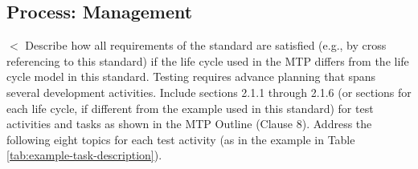 	\subsection{Process: Management} \label{s:details-of-the-master-test-plan:process-management}
			$<$ Describe how all requirements of the standard are satisfied (e.g., by cross referencing to this standard) if the life cycle used in the MTP differs from the life cycle model in this standard. Testing requires advance planning that spans several development activities. Include sections 2.1.1 through 2.1.6 (or sections for each life cycle, if different from the example used in this standard) for test activities and tasks as shown in the MTP Outline (Clause 8). 
			Address the following eight topics for each test activity (as in the example in Table \ref{tab:example-task-description}).
			
